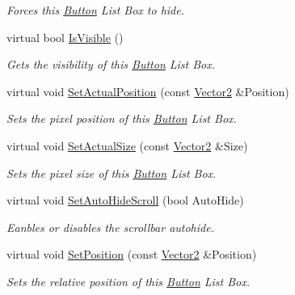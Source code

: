 \begin{DoxyCompactItemize}
\begin{DoxyCompactList}\small\item\em Forces this \hyperlink{classphys_1_1UI_1_1Button}{Button} List Box to hide. \item\end{DoxyCompactList}\item 
virtual bool \hyperlink{classphys_1_1UI_1_1ButtonListBox_a1282a1494079e47b48c8e3296b1a8bb0}{IsVisible} ()
\begin{DoxyCompactList}\small\item\em Gets the visibility of this \hyperlink{classphys_1_1UI_1_1Button}{Button} List Box. \item\end{DoxyCompactList}\item 
virtual void \hyperlink{classphys_1_1UI_1_1ButtonListBox_a3b027750d7d1a5b84a98fc348dee4e64}{SetActualPosition} (const \hyperlink{classphys_1_1Vector2}{Vector2} \&Position)
\begin{DoxyCompactList}\small\item\em Sets the pixel position of this \hyperlink{classphys_1_1UI_1_1Button}{Button} List Box. \item\end{DoxyCompactList}\item 
virtual void \hyperlink{classphys_1_1UI_1_1ButtonListBox_a40f357673d774cbecae7104a02be365e}{SetActualSize} (const \hyperlink{classphys_1_1Vector2}{Vector2} \&Size)
\begin{DoxyCompactList}\small\item\em Sets the pixel size of this \hyperlink{classphys_1_1UI_1_1Button}{Button} List Box. \item\end{DoxyCompactList}\item 
virtual void \hyperlink{classphys_1_1UI_1_1ButtonListBox_ab5caa7d6bd929875bb8ca1278743ff40}{SetAutoHideScroll} (bool AutoHide)
\begin{DoxyCompactList}\small\item\em Eanbles or disables the scrollbar autohide. \item\end{DoxyCompactList}\item 
virtual void \hyperlink{classphys_1_1UI_1_1ButtonListBox_a9c6b0bc4eb93b53c4f7172ce3a537178}{SetPosition} (const \hyperlink{classphys_1_1Vector2}{Vector2} \&Position)
\begin{DoxyCompactList}\small\item\em Sets the relative position of this \hyperlink{classphys_1_1UI_1_1Button}{Button} List Box. \item\end{DoxyCompactList}\item 

\end{DoxyCompactItemize}
